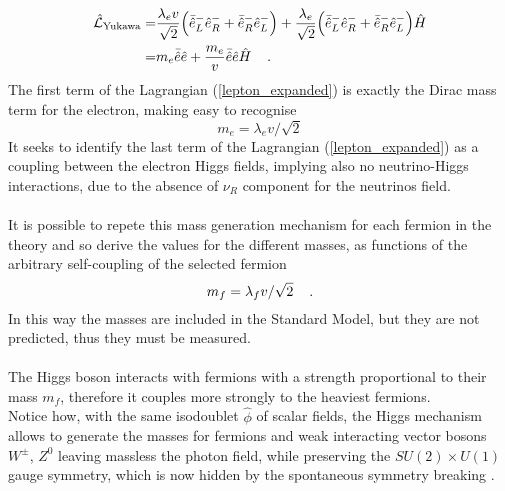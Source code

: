 \begin{align}
\begin{split}
\mathcal{\hat{L}}_{\text{Yukawa}} =& \frac{\lambda_ev}{\sqrt{2}}\Bigl(\bar{\hat{e}}^-_L\hat{e}^-_R + \bar{\hat{e}}^-_R\hat{e}^-_L\Bigr) + \frac{\lambda_e}{\sqrt{2}}\Bigl(\bar{\hat{e}}^-_L\hat{e}^-_R + \bar{\hat{e}}^-_R\hat{e}^-_L\Bigr)\hat{H} \\
=& m_e\bar{\hat{e}}\hat{e} + \frac{m_e}{v}\bar{\hat{e}}\hat{e}\hat{H} \hspace{0.4cm} \text{.}
\end{split}
\label{lepton_expanded}
\end{align}
The first term of the Lagrangian (\ref{lepton_expanded}) is exactly the Dirac mass term for the electron, making easy to recognise
\begin{equation}
m_e = \lambda_ev/\sqrt{2}
\end{equation}
It seeks to identify the last term of the Lagrangian (\ref{lepton_expanded}) as a coupling between the electron Higgs fields, implying also no neutrino-Higgs interactions, due to the absence of $\nu_R$ component for the neutrinos field.
\\\\
It is possible to repete this mass generation mechanism for each fermion in the theory and so derive the values for the different masses, as functions of the arbitrary self-coupling of the selected fermion
\begin{equation}
m_f = \lambda_fv/\sqrt{2} \hspace{0.4cm} \text{.}
\end{equation}
In this way the masses are included in the Standard Model, but they are not predicted, thus they must be measured.
\\\\
The Higgs boson interacts with fermions with a strength proportional to their mass $m_f$, therefore it couples more strongly to the heaviest fermions.
\\
Notice how, with the same isodoublet $\hat{\phi}$ of scalar fields, the Higgs mechanism allows to generate the masses for fermions and weak interacting vector bosons $W^\pm$, $Z^0$ leaving massless the photon field, while preserving the \mbox{$SU(2) \times U(1)$} gauge symmetry, which is now hidden by the spontaneous symmetry breaking \cite{Aitchison_Hey, Djouadi_2008}.

